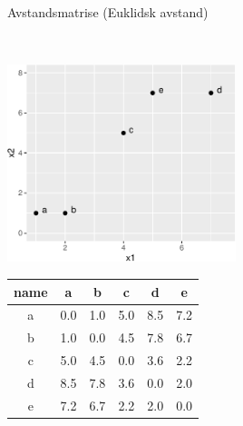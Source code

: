 \documentclass[10pt,ignorenonframetext,]{beamer}
\begin{document}
\begin{frame}

\begin{block}{Avstandsmatrise (Euklidsk avstand)}

\(~\)

\includegraphics[width=0.5\textwidth,height=\textheight]{exampleplot-1.pdf}

\begin{longtable}[]{@{}cccccc@{}}
\toprule
name & a & b & c & d & e\tabularnewline
\midrule
\endhead
a & 0.0 & 1.0 & 5.0 & 8.5 & 7.2\tabularnewline
b & 1.0 & 0.0 & 4.5 & 7.8 & 6.7\tabularnewline
c & 5.0 & 4.5 & 0.0 & 3.6 & 2.2\tabularnewline
d & 8.5 & 7.8 & 3.6 & 0.0 & 2.0\tabularnewline
e & 7.2 & 6.7 & 2.2 & 2.0 & 0.0\tabularnewline
\bottomrule
\end{longtable}

\end{block}

\end{frame}
\end{document}
